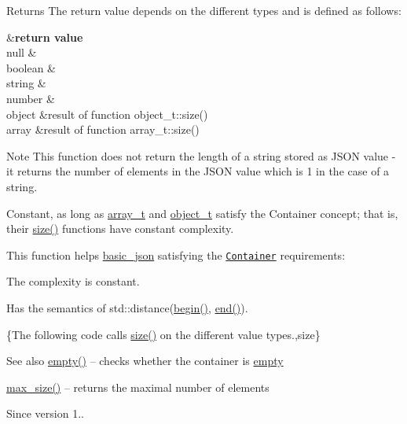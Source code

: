 \begin{DoxyReturn}{Returns}
The return value depends on the different types and is defined as follows\+: \begin{TabularC}{2}
\hline
{}&{\bf return value  }\\
null &{} \\
boolean &{} \\
string &{} \\
number &{} \\
object &result of function object\+\_\+t\+::size() \\
array &result of function array\+\_\+t\+::size() \\
\end{TabularC}

\end{DoxyReturn}
\begin{DoxyNote}{Note}
This function does not return the length of a string stored as J\+S\+O\+N value -\/ it returns the number of elements in the J\+S\+O\+N value which is 1 in the case of a string.
\end{DoxyNote}
Constant, as long as \hyperlink{classnlohmann_1_1basic__json_ab00b882d39306d663c23dab110f5cae0}{array\+\_\+t} and \hyperlink{classnlohmann_1_1basic__json_a0ac9894c9de8dc551cf2e5f1c605537f}{object\+\_\+t} satisfy the Container concept; that is, their \hyperlink{classnlohmann_1_1basic__json_a01833b332b68d9af1f7cd7a816c39e49}{size()} functions have constant complexity.

This function helps {\ttfamily \hyperlink{classnlohmann_1_1basic__json}{basic\+\_\+json}} satisfying the \href{http://en.cppreference.com/w/cpp/concept/Container}{\tt Container} requirements\+:
\begin{DoxyItemize}
\item The complexity is constant.
\item Has the semantics of {\ttfamily std\+::distance(\hyperlink{classnlohmann_1_1basic__json_ad4e381c54039607be08d7af41a1f6ad1}{begin()}, \hyperlink{classnlohmann_1_1basic__json_a12ccf14d39ddae52f6c7e126105a230b}{end()})}.
\end{DoxyItemize}

\{The following code calls {\ttfamily \hyperlink{classnlohmann_1_1basic__json_a01833b332b68d9af1f7cd7a816c39e49}{size()}} on the different value types.,size\}

\begin{DoxySeeAlso}{See also}
\hyperlink{classnlohmann_1_1basic__json_a90239431815c94b0a334f7f4c55eb859}{empty()} -- checks whether the container is \hyperlink{classnlohmann_1_1basic__json_a90239431815c94b0a334f7f4c55eb859}{empty} 

\hyperlink{classnlohmann_1_1basic__json_ad5514a7435f246fc5335856465022a7a}{max\+\_\+size()} -- returns the maximal number of elements
\end{DoxySeeAlso}
\begin{DoxySince}{Since}
version 1.. 
\end{DoxySince}


